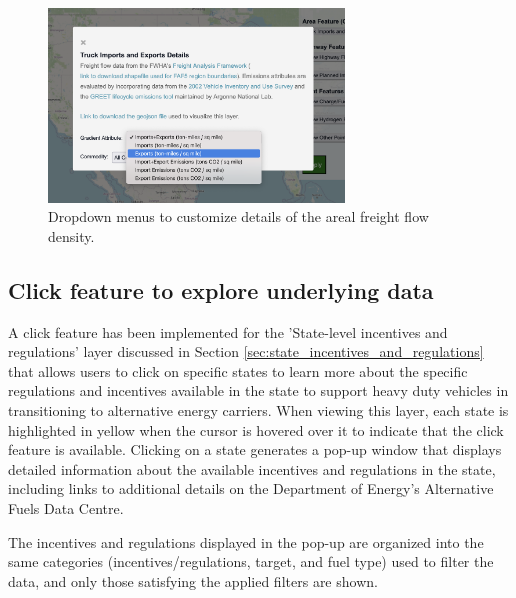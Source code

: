 \begin{figure}[ht]
        \centering
        \includegraphics[width=0.7\textwidth]{figures/popup_dropdown.png}
        \caption{Dropdown menus to customize details of the areal freight flow density.}
        \label{fig:popup_dropdown}
\end{figure}

\subsection{Click feature to explore underlying data}

A click feature has been implemented for the 'State-level incentives and regulations' layer discussed in Section \ref{sec:state_incentives_and_regulations} that allows users to click on specific states to learn more about the specific regulations and incentives available in the state to support heavy duty vehicles in transitioning to alternative energy carriers. When viewing this layer, each state is highlighted in yellow when the cursor is hovered over it to indicate that the click feature is available. Clicking on a state generates a pop-up window that displays detailed information about the available incentives and regulations in the state, including links to additional details on the Department of Energy's Alternative Fuels Data Centre. 

The incentives and regulations displayed in the pop-up are organized into the same categories (incentives/regulations, target, and fuel type) used to filter the data, and only those satisfying the applied filters are shown. 

